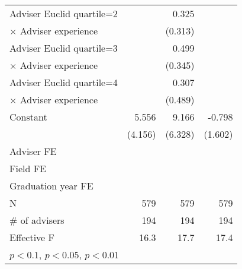 {\begin{tabular}{l*{3}{D{.}{.}{-1}}}
\addlinespace
Adviser Euclid quartile=2     	&                        	&          0.325         	&                        \\
$\times$ Adviser experience   	&                        	&        (0.313)         	&                        \\
\addlinespace
Adviser Euclid quartile=3     	&                        	&          0.499         	&                        \\
$\times$ Adviser experience   	&                        	&        (0.345)         	&                        \\
\addlinespace
Adviser Euclid quartile=4     	&                        	&          0.307         	&                        \\
$\times$ Adviser experience   	&                        	&        (0.489)         	&                        \\
\addlinespace
Constant                      	&          5.556         	&          9.166         	&         -0.798         \\
                              	&        (4.156)         	&        (6.328)         	&        (1.602)         \\
\addlinespace
Adviser FE                    	&     \checkmark         	&     \checkmark         	&     \checkmark         \\
\addlinespace
Field FE                      	&     \checkmark         	&     \checkmark         	&     \checkmark         \\
\addlinespace
Graduation year FE            	&     \checkmark         	&     \checkmark         	&     \checkmark         \\
\midrule
N                             	&            579         	&            579         	&            579         \\
\# of advisers                	&            194         	&            194         	&            194         \\
Effective F                   	&           16.3         	&           17.7         	&           17.4         \\
\bottomrule
{}\\
\end{tabular}
}
